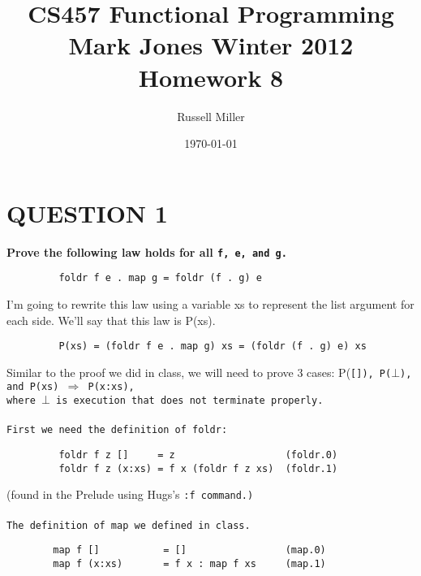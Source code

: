 \documentclass{article}
\title{CS457 Functional Programming\\
Mark Jones Winter 2012\\
Homework 8}
\author{Russell Miller}
\date{\today}
\begin{document}
\maketitle

\section*{QUESTION 1}
\textbf{Prove the following law holds for all \tt{f, e, and g.}}
\begin{verbatim}
         foldr f e . map g = foldr (f . g) e
\end{verbatim}

\noindent I'm going to rewrite this law using a variable xs to represent the
list argument for each side. We'll say that this law is P(xs).
\begin{verbatim}
         P(xs) = (foldr f e . map g) xs = (foldr (f . g) e) xs
\end{verbatim}

\noindent Similar to the proof we did in class, we will need to prove 3 cases:
P(\tt []\rm), P($\bot$), and P(xs) $\Rightarrow$ P(x:xs),\\
where $\bot$ is execution that does not
terminate properly.\\
\\
First we need the definition of \tt foldr:
\begin{verbatim}
         foldr f z []     = z                   (foldr.0)
         foldr f z (x:xs) = f x (foldr f z xs)  (foldr.1)
\end{verbatim}

\rm (found in the Prelude using Hugs's \tt :f \rm command.)\\
\\
The definition of map we defined in class.
\begin{verbatim}
        map f []           = []                 (map.0)
        map f (x:xs)       = f x : map f xs     (map.1)
\end{verbatim}
\end{document}
